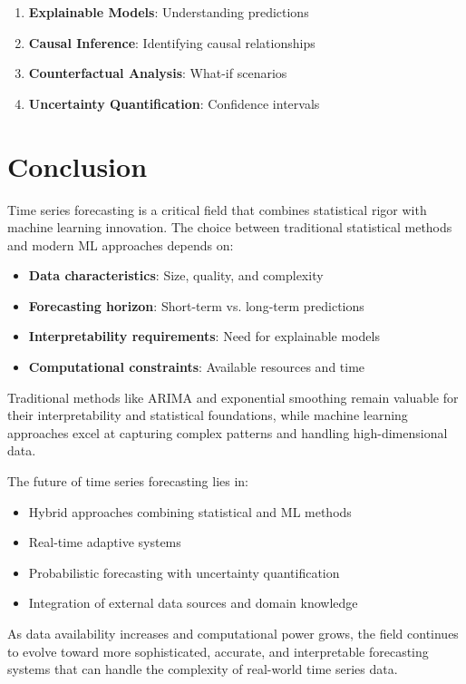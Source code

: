 \documentclass[11pt,a4paper]{article}
\begin{document}
\begin{enumerate}
\item \textbf{Explainable Models}: Understanding predictions
\item \textbf{Causal Inference}: Identifying causal relationships
\item \textbf{Counterfactual Analysis}: What-if scenarios
\item \textbf{Uncertainty Quantification}: Confidence intervals
\end{enumerate}

\section{Conclusion}

Time series forecasting is a critical field that combines statistical rigor with machine learning innovation. The choice between traditional statistical methods and modern ML approaches depends on:

\begin{itemize}
\item \textbf{Data characteristics}: Size, quality, and complexity
\item \textbf{Forecasting horizon}: Short-term vs. long-term predictions
\item \textbf{Interpretability requirements}: Need for explainable models
\item \textbf{Computational constraints}: Available resources and time
\end{itemize}

Traditional methods like ARIMA and exponential smoothing remain valuable for their interpretability and statistical foundations, while machine learning approaches excel at capturing complex patterns and handling high-dimensional data.

The future of time series forecasting lies in:
\begin{itemize}
\item Hybrid approaches combining statistical and ML methods
\item Real-time adaptive systems
\item Probabilistic forecasting with uncertainty quantification
\item Integration of external data sources and domain knowledge
\end{itemize}

As data availability increases and computational power grows, the field continues to evolve toward more sophisticated, accurate, and interpretable forecasting systems that can handle the complexity of real-world time series data.
\end{document}
